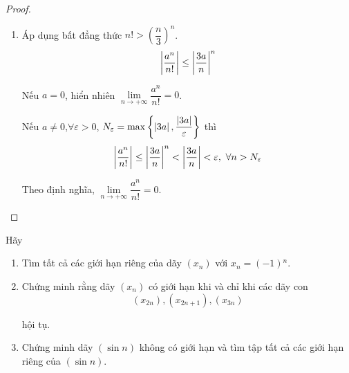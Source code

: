 \documentclass[class=analysis,crop=false]{standalone}
\begin{document}
\begin{proof}
\begin{enumerate}[label = (\roman*)]
        \item Áp dụng bất đẳng thức $n! > \left(\dfrac{n}{3}\right)^{n}$.
            \[
                \left\vert{\dfrac{a^{n}}{n!}}\right\vert \le \left\vert{\dfrac{3a}{n}}\right\vert^{n}
            \]
            \par Nếu $a = 0$, hiển nhiên $\lim\limits_{n\to+\infty}\dfrac{a^{n}}{n!} = 0$.
            \par Nếu $a\ne 0$,$\forall\varepsilon > 0$, $N_{\varepsilon} = \max\left\{ \left\vert{3a}\right\vert, \dfrac{\left\vert{3a}\right\vert}{\varepsilon} \right\}$ thì
            \[
                \abs{\dfrac{a^{n}}{n!}} \le \abs{\dfrac{3a}{n}}^{n} < \abs{\dfrac{3a}{n}} < \varepsilon,\ \forall n > N_{\varepsilon}
            \]
            \par Theo định nghĩa, $\lim\limits_{n\to+\infty}\dfrac{a^{n}}{n!} = 0$.
    \end{enumerate}
\end{proof}

\begin{exercise}
    \par Hãy
    \begin{enumerate}[label = (\roman*)]
        \item Tìm tất cả các giới hạn riêng của dãy $(x_{n})$ với $x_{n} = (-1){}^{n}$.
        \item Chứng minh rằng dãy $(x_{n})$ có giới hạn khi và chỉ khi các dãy con
            \[ (x_{2n}), (x_{2n+1}), (x_{3n}) \]
            \par hội tụ.
        \item Chứng minh dãy $(\sin n)$ không có giới hạn và tìm tập tất cả các giới hạn riêng của $(\sin n)$.
    \end{enumerate}
\end{exercise}
\end{document}
